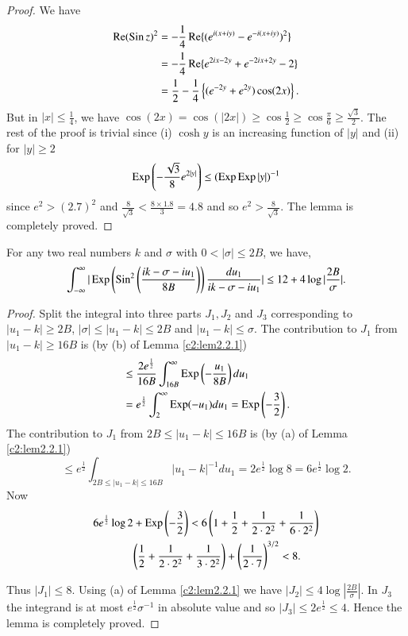 \begin{proof}
We have\pageoriginale
\begin{align*}
\operatorname{Re} (\operatorname{Sin} z)^2 & = -\frac{1}{4} \operatorname{Re} \{(e^{i(x+iy)}  - e^{-i(x+iy)})^2\}\\
& = -\frac{1}{4} \operatorname{Re} \{e^{2 i x - 2y} + e^{-2ix+ 2y} -2\}\\
& = \frac{1}{2} - \frac{1}{4} \left\{(e^{-2y} + e^{2y}) \cos (2x) \right\}.
\end{align*} 
But in $|x| \leq \frac{1}{4}$, we have $\cos (2x) = \cos (|2x|) \geq \cos \frac{1}{2} \geq \cos \frac{\pi}{6} \geq \frac{\sqrt{3}}{2}$. The rest of the proof is trivial since (i) $\cosh y$ is an increasing function of $|y|$ and (ii) for $|y| \geq 2$
$$
\operatorname{Exp} \left(-\frac{\sqrt{3}}{8} e^{2|y|} \right) \leq (\operatorname{Exp} \operatorname{Exp} |y|)^{-1}
$$
since $e^2 > (2.7)^2$ and $\frac{8}{\sqrt{3}} < \frac{8 \times 1.8}{3} = 4.8$ and so $e^2 > \frac{8}{\sqrt{3}}$. The lemma is completely proved.
\end{proof}

\begin{sublemma}\label{c2:lem2.2.2}
For any two real numbers $k$ and $\sigma$ with $0 < |\sigma| \leq 2B$, we have,
$$
\int^\infty_{-\infty} |\operatorname{Exp} \left(\operatorname{Sin}^2 \left( \frac{ik - \sigma - iu_1}{8B}\right) \right) \frac{du_1}{ik-\sigma - iu_1}| \leq 12 + 4 \log |\frac{2B}{\sigma}|. 
$$
\end{sublemma}

\begin{proof}
Split the integral into three parts $J_1, J_2$ and $J_3$ corresponding to $|u_1 - k| \geq 2B$, $|\sigma| \leq | u_1 - k |\leq 2B$ and $|u_1 - k| \leq \sigma$. The contribution to $J_1$ from $|u_1 -k| \geq 16 B$ is (by (b) of Lemma \ref{c2:lem2.2.1})
\begin{align*}
& \leq \frac{2e^{\frac{1}{2}}}{16B}\int^{\infty}_{16B} \operatorname{Exp} \left(-\frac{u_1}{8B} \right) du_1\\
& = e^{\frac{1}{2}} \int^\infty_{2} \operatorname{Exp} (-u_1) du_1 = \operatorname{Exp} \left(-\frac{3}{2} \right).
\end{align*}
The contribution to $J_1$ from $2B \leq |u_1 - k |\leq 16 B$ is (by (a) of Lemma \ref{c2:lem2.2.1})
$$
\leq e^{\frac{1}{2}} \int_{2B \leq |u_1 - k| \leq 16 B} |u_1 - k|^{-1} du_1 = 2 e^{\frac{1}{2}} \log 8 = 6e^{\frac{1}{2}} \log 2. 
$$
Now
\begin{gather*}
6e^{\frac{1}{2}} \log 2 + \operatorname{Exp} \left( -\frac{3}{2}\right) < 6 \left(
1+ \frac{1}{2} + \frac{1}{2\cdot 2^2} + \frac{1}{6  \cdot
  2^2}\right)\\
\qquad \left(\frac{1}{2} + \frac{1}{2\cdot 2^2} + \frac{1}{3\cdot 2^2} \right)
+ \left(\frac{1}{2 \cdot 7} \right)^{3/2} < 8.
\end{gather*}

\pageoriginale
Thus $|J_1| \leq 8$. Using (a) of Lemma \ref{c2:lem2.2.1} we have $|J_2| \leq 4 \log |\frac{2B}{\sigma}|$. In $J_3$ the integrand is at most $e^{\frac{1}{2}} \sigma^{-1}$ in absolute value and so $|J_3| \leq 2e^{\frac{1}{2}} \leq 4$. Hence the lemma is completely proved.
\end{proof}

